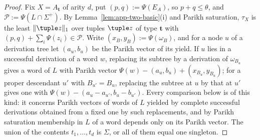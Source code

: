 \begin{proof}
Fix $X=A_{\mathbf t}$ of arity $d$, put $(p,q):=\Psi(E_A)$, so $p+q\le\theta$, and
$\mathcal P:=\Psi(L\cap\Sigma^+)$.  By Lemma~\ref{lem:app-two-basic}(i) and Parikh
saturation, $\tau_X$ is the least $\|\tuple z\|_1$ over tuples $\tuple z$ of type
$\mathbf t$ with $(p,q)+\sum_i\Psi(z_i)\in\mathcal P$.  Write $(x_B,y_B):=\Psi(\omega_B)$,
and for a node $u$ of a derivation tree let $(a_u,b_u)$ be the Parikh vector of
its yield.  If $u$ lies in a successful derivation of a word $w$, replacing its
subtree by a derivation of $\omega_{B_u}$ gives a word of $L$ with Parikh vector
$\Psi(w)-(a_u,b_u)+(x_{B_u},y_{B_u})$; for a proper descendant $u'$ with
$B_{u'}=B_u$, replacing the subtree at $u$ by that at $u'$ gives one with
$\Psi(w)-(a_u-a_{u'},b_u-b_{u'})$.  Every comparison below is of this kind: it
concerns Parikh vectors of words of $L$ yielded by complete successful
derivations obtained from a fixed one by such replacements, and by Parikh
saturation membership in $L$ of a word depends only on its Parikh vector.  The union of the contents $t_1,\dots,t_d$ is
$\Sigma$, or all of them equal one singleton.


\end{proof}
